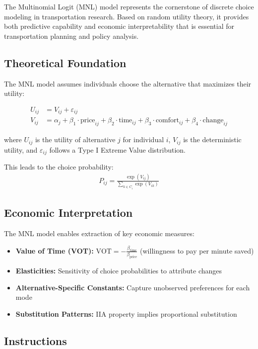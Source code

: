 \documentclass[11pt]{article}
\begin{document}
The Multinomial Logit (MNL) model represents the cornerstone of discrete choice modeling in transportation research. Based on random utility theory, it provides both predictive capability and economic interpretability that is essential for transportation planning and policy analysis.

\subsection*{Theoretical Foundation}

The MNL model assumes individuals choose the alternative that maximizes their utility:

\begin{align}
U_{ij} &= V_{ij} + \varepsilon_{ij} \\
V_{ij} &= \alpha_j + \beta_1 \cdot \text{price}_{ij} + \beta_2 \cdot \text{time}_{ij} + \beta_3 \cdot \text{comfort}_{ij} + \beta_4 \cdot \text{change}_{ij}
\end{align}

where $U_{ij}$ is the utility of alternative $j$ for individual $i$, $V_{ij}$ is the deterministic utility, and $\varepsilon_{ij}$ follows a Type I Extreme Value distribution.

This leads to the choice probability:
\begin{align}
P_{ij} = \frac{\exp(V_{ij})}{\sum_{k \in C_i} \exp(V_{ik})}
\end{align}

\subsection*{Economic Interpretation}

The MNL model enables extraction of key economic measures:
\begin{itemize}
\item \textbf{Value of Time (VOT):} $\text{VOT} = -\frac{\beta_{\text{time}}}{\beta_{\text{price}}}$ (willingness to pay per minute saved)
\item \textbf{Elasticities:} Sensitivity of choice probabilities to attribute changes
\item \textbf{Alternative-Specific Constants:} Capture unobserved preferences for each mode
\item \textbf{Substitution Patterns:} IIA property implies proportional substitution
\end{itemize}

\subsection*{Instructions}
\end{document}
